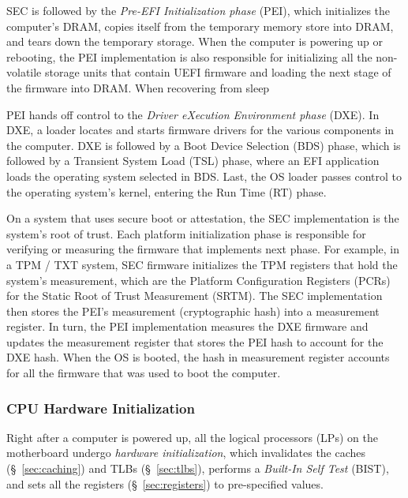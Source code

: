 SEC is followed by the \textit{Pre-EFI Initialization phase} (PEI), which
initializes the computer's DRAM, copies itself from the temporary memory
store into DRAM, and tears down the temporary storage. When the computer is
powering up or rebooting, the PEI implementation is also responsible for
initializing all the non-volatile storage units that contain UEFI firmware and
loading the next stage of the firmware into DRAM. When recovering from sleep

PEI hands off control to the \textit{Driver eXecution Environment phase} (DXE).
In DXE, a loader locates and starts firmware drivers for the various components
in the computer. DXE is followed by a Boot Device Selection (BDS) phase, which
is followed by a Transient System Load (TSL) phase, where an EFI application
loads the operating system selected in BDS. Last, the OS loader passes control
to the operating system's kernel, entering the Run Time (RT) phase.

On a system that uses secure boot or attestation, the SEC implementation is the
system's root of trust. Each platform initialization phase is responsible for
verifying or measuring the firmware that implements next phase. For example, in
a TPM / TXT system, SEC firmware initializes the TPM registers that hold the
system's measurement, which are the Platform Configuration Registers (PCRs) for
the Static Root of Trust Measurement (SRTM). The SEC implementation then stores
the PEI's measurement (cryptographic hash) into a measurement register. In
turn, the PEI implementation measures the DXE firmware and updates the
measurement register that stores the PEI hash to account for the DXE hash. When
the OS is booted, the hash in measurement register accounts for all the
firmware that was used to boot the computer.


\subsubsection{CPU Hardware Initialization}
\label{sec:cpu_init}


Right after a computer is powered up, all the logical processors (LPs) on the
motherboard undergo \textit{hardware initialization}, which invalidates the
caches (\S~\ref{sec:caching}) and TLBs (\S~\ref{sec:tlbs}), performs a
\textit{Built-In Self Test} (BIST), and sets all the registers
(\S~\ref{sec:registers}) to pre-specified values.



